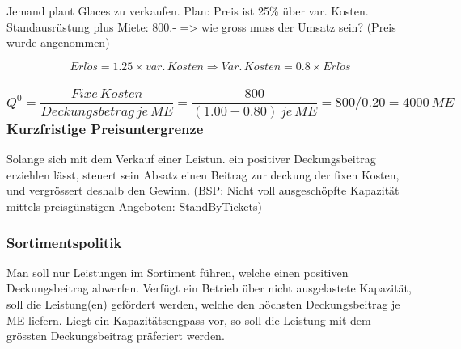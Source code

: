 Jemand plant Glaces zu verkaufen. Plan: Preis ist 25\% über var. Kosten.
Standausrüstung plus Miete: 800.- => wie gross muss der Umsatz sein?
(Preis wurde angenommen)

\[
Erl\ddot{o}s=1.25\times var.\, Kosten\Longrightarrow Var.\, Kosten=0.8\times Erl\ddot{o}s
\]



\subsubsection*{
\[
Q^{0}=\frac{Fixe\, Kosten}{Deckungsbetrag\, je\, ME}=\frac{800}{(1.00-0.80)\, je\, ME}=800/0.20=4000\, ME
\]
 Kurzfristige Preisuntergrenze}

Solange sich mit dem Verkauf einer Leistun. ein positiver Deckungsbeitrag
erziehlen lässt, steuert sein Absatz einen Beitrag zur deckung der
fixen Kosten, und vergrössert deshalb den Gewinn. (BSP: Nicht voll
ausgeschöpfte Kapazität mittels preisgünstigen Angeboten: StandByTickets)


\subsubsection*{Sortimentspolitik}

Man soll nur Leistungen im Sortiment führen, welche einen positiven
Deckungsbeitrag abwerfen. Verfügt ein Betrieb über nicht ausgelastete
Kapazität, soll die Leistung(en) gefördert werden, welche den höchsten
Deckungsbeitrag je ME liefern. Liegt ein Kapazitätsengpass vor, so
soll die Leistung mit dem grössten Deckungsbeitrag präferiert werden.
